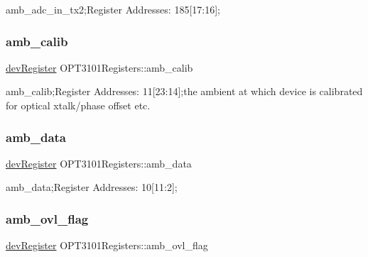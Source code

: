 amb\+\_\+adc\+\_\+in\+\_\+tx2;Register Addresses\+: 185\mbox{[}17\+:16\mbox{]}; 

\mbox{\label{class_o_p_t3101_registers_a84706d3f7f7c46a9727e59aed0106cc9}} 
\subsubsection{\texorpdfstring{amb\+\_\+calib}{amb\_calib}}
{\footnotesize\ttfamily \mbox{\hyperlink{classdev_register}{dev\+Register}} O\+P\+T3101\+Registers\+::amb\+\_\+calib}



amb\+\_\+calib;Register Addresses\+: 11\mbox{[}23\+:14\mbox{]};the ambient at which device is calibrated for optical xtalk/phase offset etc. 

\mbox{\label{class_o_p_t3101_registers_a096c1c1a754ad15df12a9a3fda98fb00}} 
\subsubsection{\texorpdfstring{amb\+\_\+data}{amb\_data}}
{\footnotesize\ttfamily \mbox{\hyperlink{classdev_register}{dev\+Register}} O\+P\+T3101\+Registers\+::amb\+\_\+data}



amb\+\_\+data;Register Addresses\+: 10\mbox{[}11\+:2\mbox{]}; 

\mbox{\label{class_o_p_t3101_registers_a19befaa619d0fb2f67f549afcc1a2182}} 
\subsubsection{\texorpdfstring{amb\+\_\+ovl\+\_\+flag}{amb\_ovl\_flag}}
{\footnotesize\ttfamily \mbox{\hyperlink{classdev_register}{dev\+Register}} O\+P\+T3101\+Registers\+::amb\+\_\+ovl\+\_\+flag}



